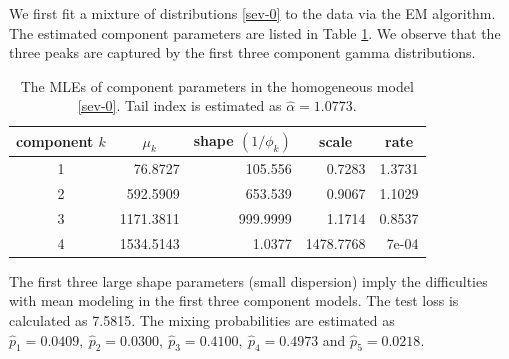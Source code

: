 \documentclass[11pt]{article}
\numberwithin{equation}{section}
\begin{document}
We first fit a mixture of distributions \eqref{sev-0} to the data via the EM algorithm. 
The estimated component parameters are listed in Table \ref{null-gamma}. We observe that the three peaks are captured by the first three component gamma distributions.
	\begin{table}[h!]
		\centering
		\caption{The MLEs of component parameters in the homogeneous model \eqref{sev-0}. Tail index is estimated as $\hat{\alpha}=1.0773$.}\label{null-gamma}
		\begin{tabular}{crrrr}
			\hline
			component $k$ & \multicolumn{1}{c}{$\mu_k$} & \multicolumn{1}{c}{shape $(1/\phi_k)$} & \multicolumn{1}{c}{scale} & \multicolumn{1}{c}{rate} \\ \hline
			1         & 76.8727                & 105.556                   & 0.7283                    & 1.3731                   \\
			2         & 592.5909               & 653.539                   & 0.9067                    & 1.1029                   \\
			3         & 1171.3811              & 999.9999                  & 1.1714                    & 0.8537                   \\
			4         & 1534.5143              & 1.0377                    & 1478.7768                 & 7e-04                    \\ \hline
		\end{tabular}
	\end{table}
	The first three large shape parameters (small dispersion) imply the  difficulties with {mean modeling} in the first three component models.
	 The test loss is calculated as 7.5815. The mixing probabilities are estimated as $\hat{p}_1=0.0409,~ \hat{p}_2=0.0300, ~\hat{p}_3=0.4100,~ \hat{p}_4=0.4973$ and $\hat{p}_5=0.0218.$
\end{document}
